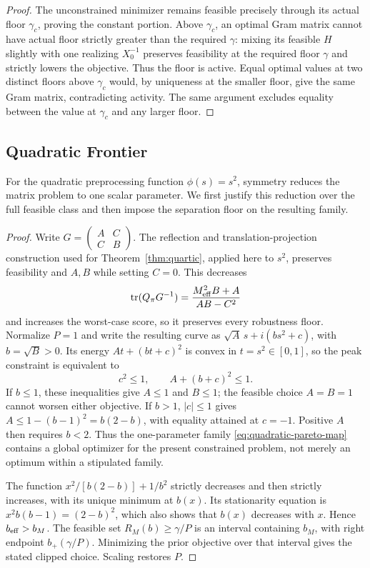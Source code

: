 \begin{proof}
The unconstrained minimizer remains feasible precisely through its actual floor $\gamma_c$, proving the constant portion. Above $\gamma_c$, an optimal Gram matrix cannot have actual floor strictly greater than the required $\gamma$: mixing its feasible $H$ slightly with one realizing $X_0^{-1}$ preserves feasibility at the required floor $\gamma$ and strictly lowers the objective. Thus the floor is active. Equal optimal values at two distinct floors above $\gamma_c$ would, by uniqueness at the smaller floor, give the same Gram matrix, contradicting activity. The same argument excludes equality between the value at $\gamma_c$ and any larger floor.
\end{proof}

\subsection{Quadratic Frontier}\label{app:quadratic-frontier-proof}
For the quadratic preprocessing function $\phi(s)=s^2$, symmetry reduces the matrix problem to one scalar parameter. We first justify this reduction over the full feasible class and then impose the separation floor on the resulting family.
\begin{proof}
Write $G=\left(\begin{smallmatrix}A&C\\C&B\end{smallmatrix}\right)$. The reflection and translation-projection construction used for Theorem~\ref{thm:quartic}, applied here to $s^2$, preserves feasibility and $A,B$ while setting $C=0$. This decreases
$$
 \operatorname{tr}(Q_\pi G^{-1})
 =\frac{M_{\rm eff}^2B+A}{AB-C^2}
$$
and increases the worst-case score, so it preserves every robustness floor. Normalize $P=1$ and write the resulting curve as $\sqrt A\,s+i(bs^2+c)$, with $b=\sqrt B>0$. Its energy $At+(bt+c)^2$ is convex in $t=s^2\in[0,1]$, so the peak constraint is equivalent to
$$c^2\le1,\qquad A+(b+c)^2\le1.$$
If $b\le1$, these inequalities give $A\le1$ and $B\le1$; the feasible choice $A=B=1$ cannot worsen either objective. If $b>1$, $|c|\le1$ gives $A\le1-(b-1)^2=b(2-b)$, with equality attained at $c=-1$. Positive $A$ then requires $b<2$. Thus the one-parameter family \eqref{eq:quadratic-pareto-map} contains a global optimizer for the present constrained problem, not merely an optimum within a stipulated family.

The function $x^2/[b(2-b)]+1/b^2$ strictly decreases and then strictly increases, with its unique minimum at $b(x)$. Its stationarity equation is $x^2b(b-1)=(2-b)^2$, which also shows that $b(x)$ decreases with $x$. Hence $b_{\rm eff}>b_M$. The feasible set $R_M(b)\ge\gamma/P$ is an interval containing $b_M$, with right endpoint $b_+(\gamma/P)$. Minimizing the prior objective over that interval gives the stated clipped choice. Scaling restores $P$.
\end{proof}
